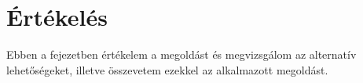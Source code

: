 \chapter{Értékelés}

Ebben a fejezetben értékelem a megoldást és megvizsgálom az alternatív lehetőségeket, illetve összevetem ezekkel az alkalmazott megoldást.